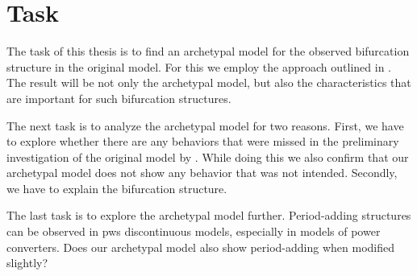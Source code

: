 \chapter{Task}
\label{chap:task}

The task of this thesis is to find an archetypal model for the observed bifurcation structure in the original model.
For this we employ the approach outlined in .
The result will be not only the archetypal model, but also the characteristics that are important for such bifurcation structures.

The next task is to analyze the archetypal model for two reasons.
First, we have to explore whether there are any behaviors that were missed in the preliminary investigation of the original model by .
While doing this we also confirm that our archetypal model does not show any behavior that was not intended.
Secondly, we have to explain the bifurcation structure.

The last task is to explore the archetypal model further.
Period-adding structures can be observed in \gls{pws} discontinuous models, especially in models of power converters.
Does our archetypal model also show period-adding when modified slightly?

